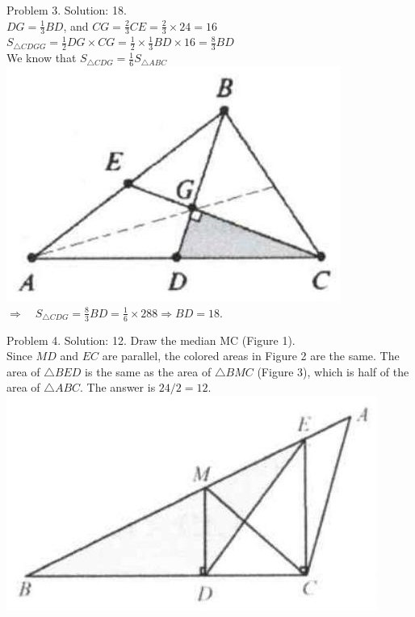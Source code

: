 \documentclass[10pt]{article}
\begin{document}
Problem 3. Solution: 18.\\
\(D G=\frac{1}{3} B D\), and \(C G=\frac{2}{3} C E=\frac{2}{3} \times 24=16\)\\
\(S_{\triangle C D G G}=\frac{1}{2} D G \times C G=\frac{1}{2} \times \frac{1}{3} B D \times 16=\frac{8}{3} B D\)\\
We know that \(S_{\triangle C D G}=\frac{1}{6} S_{\triangle A B C}\)\\
\includegraphics[max width=\textwidth, center]{2025_04_17_97bc1f7e44d93c271a88g-018(3)}\\
\(\Rightarrow \quad S_{\triangle C D G}=\frac{8}{3} B D=\frac{1}{6} \times 288 \Rightarrow B D=18\).

Problem 4. Solution: 12.
Draw the median MC (Figure 1).\\
Since \(M D\) and \(E C\) are parallel, the colored areas in Figure 2 are the same. The area of \(\triangle B E D\) is the same as the area of \(\triangle B M C\) (Figure 3), which is half of the area of \(\triangle A B C\). The answer is \(24 / 2=12\).\\
\includegraphics[max width=\textwidth, center]{2025_04_17_97bc1f7e44d93c271a88g-018(2)}
\end{document}
